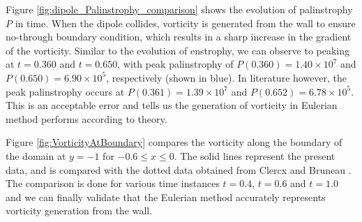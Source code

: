 
Figure \ref{fig:dipole_Palinstrophy_comparison} shows the evolution of palinstrophy $P$ in time. When the dipole collides, vorticity is generated from the wall to ensure no-through boundary condition, which results in a sharp increase in the gradient of the vorticity.  Similar to the evolution of enstrophy, we can observe to peaking at $t=0.360$ and $t=0.650$, with peak palinstrophy of $P(0.360)=1.40\times10^7$ and $P(0.650)=6.90\times10^{5}$, respectively (shown in blue). In literature however, the peak palinstrophy occurs at $P(0.361) =1.39\times10^7$ and 
$P(0.652)=6.78\times10^{5}$. This is an acceptable error and tells us the generation of vorticity in Eulerian method performs according to theory.

	
Figure \ref{fig:VorticityAtBoundary} compares the vorticity along the boundary of the domain at $y=-1$ for $-0.6 \leqslant x \leqslant 0$. The solid lines represent the present data, and is compared with the dotted data obtained from Clercx and Bruneau \cite{Clercx2006a}. The comparison is done for various time instances $t=0.4$, $t=0.6$ and $t=1.0$ and we can finally validate that the Eulerian method accurately represents vorticity generation from the wall.


